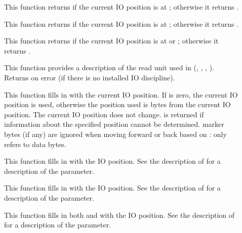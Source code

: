 \begin{description}
\item[\small{}]
This function returns  if the current IO position is
at ; otherwise it returns .

\item[\small{}]
This function returns  if the current IO position is
at ; otherwise it returns .

\item[\small{}]
This function returns  if the current IO position is
at  or ; otherwise it returns .

\item[\small{}]
This function provides a description of the read unit used in 
(\eg{}, , ,
\etc{}). Returns  on error (if there is no installed IO discipline).

\item[\small{}]
This function fills in  with the current IO position.
If  is zero, the current IO position is
used, otherwise the position used is  bytes from the
current IO position.  
The current IO position does not change.   is returned if
information about the specified position cannot be determined. 
 marker bytes (if any) are ignored when moving forward or back
based on :  only refers to data bytes.

\item[\small{}]
This function fills in  with the IO position.
See the description of  for a description of the
 parameter.

\item[\small{}]
This function fills in  with the IO position.
See the description of  for a description of the
 parameter.
 
\item[\small{}]
This function fills in both  and  with the IO
position. See the description of  for a description of the
 parameter.
\end{description}


